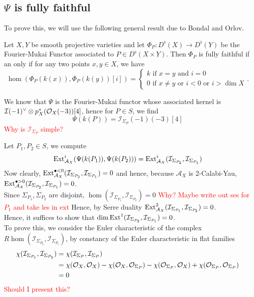 \subsection*{$\Psi$ is fully faithful}
To prove this, we will use the following general result due to Bondal and Orlov.
\begin{thm}
Let $X, Y$ be smooth projective varieties and let $\Phi_P\colon D^{\flat}( X) \to D^{\flat}( Y)  $ be the Fourier-Mukai Functor associated to $P \in D^{\flat}( X\times Y) $.
Then $\Phi_{P} $ is fully faithful if an only if for any two points $x, y \in X$, we have
\[ 
\hom( \Phi_P( k( x) ) , \Phi_P( k( y) ) [ i] ) =
\begin{cases}
k \text{ if } x=y \text{ and } i=0\\
0 \text{ if } x\neq y \text{ or } i<0 \text{ or } i>\dim X
\end{cases}.
\]
\end{thm}
We know that $\Psi$ is the Fourier-Mukai functor whose associated kernel is $\mathcal{I}( -1)^{\vee}\otimes p_X^{\ast} ( \mathcal{O}_X( -3) ) [ 4] $, hence for $P \in S$, we find
\[ 
\Psi( k( P) ) = \mathcal{I}_{\Sigma_P} ( -1) ( -3) [ 4] 
\]
\textcolor{red}{Why is $ \mathcal{I}_{\Sigma_P} $ simple?}

Let $P_1,P_2\in S$, we compute
\[ 
\operatorname{Ext}^{i}_{\mathcal{A}_X} ( \Psi( k( P_1) ) , \Psi( k( P_2) ) ) = \operatorname{Ext}^{i}_{\mathcal{A}_X} ( \mathcal{I}_{\Sigma_{P_2} }  , \mathcal{I}_{\Sigma_{P_1} }  )
\]
Now clearly, $\operatorname{Ext}^{\bullet <0}_{\mathcal{A}_X}( \mathcal{I}_{\Sigma_{P_2} }, \mathcal{I}_{\Sigma_{P_1} } ) =0$ and hence, because $\mathcal{A}_X$ is 2-Calabi-Yau, $\operatorname{Ext}^{\bullet>0}_{\mathcal{A}_X} ( \mathcal{I}_{\Sigma_{P_2} } , \mathcal{I}_{\Sigma_{P_1} } ) =0$.\\
Since $\Sigma_{P_1}, \Sigma_{P_2}  $ are disjoint, $\hom( \mathcal{I}_{\Sigma_{P_1} } , \mathcal{I}_{\Sigma_{P_2} } ) =0$ \textcolor{red}{Why? Maybe write out ses for $P_1$ and take les in ext}
Hence, by Serre duality $\operatorname{Ext}^{2}_{\mathcal{A}_X} ( \mathcal{I}_{\Sigma_{P_1} } , \mathcal{I}_{\Sigma_{P_2} } ) =0$.\\
Hence, it suffices to show that $\dim \operatorname{Ext}^{1}( \mathcal{I}_{\Sigma_{P_2} }, \mathcal{I}_{\Sigma_{P_1} }  )=0$.\\
To prove this, we consider the Euler characteristic of the complex $R\hom( \mathcal{I}_{\Sigma_{P_2} } , \mathcal{I}_{\Sigma_{P_1} } ) $, by constancy of the Euler characteristic in flat families
\begin{align*}
	\chi( \mathcal{I}_{\Sigma_{P_1} } , \mathcal{I}_{\Sigma_{P_2} } ) &= \chi( \mathcal{I}_{\Sigma_{P} } , \mathcal{I}_{\Sigma_P} ) \\
									  &= \chi( \mathcal{O}_X,\mathcal{O}_X) -\chi( \mathcal{O}_X, \mathcal{O}_{\Sigma_P} ) - \chi( \mathcal{O}_{\Sigma_P} , \mathcal{O}_X) + \chi( \mathcal{O}_{\Sigma_P} ,\mathcal{O}_{\Sigma_P} ) \\
									  &= 0
\end{align*}
\textcolor{red}{Should I present this?}


